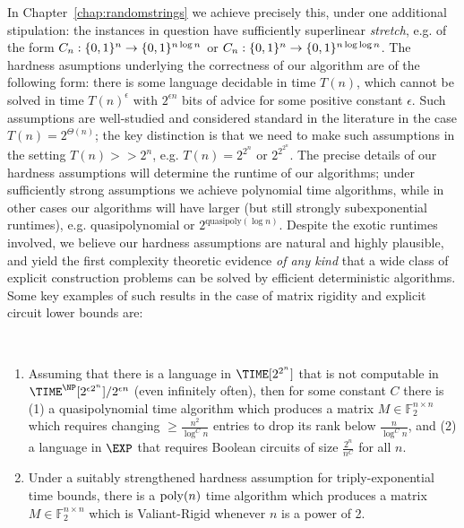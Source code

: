 In Chapter~\ref{chap:randomstrings} we achieve precisely this, under one additional stipulation: the \avoid instances in question have sufficiently superlinear \emph{stretch}, e.g. of the form $C_n: \{0,1\}^n \to \{0,1\}^{n \log n}$ or $C_n: \{0,1\}^n \to \{0,1\}^{n \log \log n}$. The hardness asumptions underlying the correctness of our algorithm are of the following form: there is some language decidable in time $T(n)$, which cannot be solved in time $T(n)^{\epsilon}$ with $2^{\epsilon n}$ bits of advice for some positive constant $\epsilon$. Such assumptions are well-studied and considered standard in the literature in the case $T(n) = 2^{\Theta(n)}$; the key distinction is that we need to make such assumptions in the setting $T(n) >> 2^n$, e.g. $T(n) = 2^{2^n}$ or $2^{2^{2^n}}$. The precise details of our hardness assumptions will determine the runtime of our algorithms; under sufficiently strong assumptions we achieve polynomial time algorithms, while in other cases our algorithms will have larger (but still strongly subexponential runtimes), e.g. quasipolynomial or $2^{\mathrm{quasipoly}(\log n)}$. Despite the exotic runtimes involved, we believe our hardness assumptions are natural and highly plausible, and yield the first complexity theoretic evidence \emph{of any kind} that a wide class of explicit construction problems can be solved by efficient deterministic algorithms. Some key examples of such results in the case of matrix rigidity and explicit circuit lower bounds are:

\begin{theorem*}
~
\begin{enumerate}
    \item Assuming that there is a language in $\TIME[2^{2^n}]$ that is not computable in $\TIME^\NP[2^{\epsilon 2^n}]/2^{\epsilon n}$ (even infinitely often), then for some constant $C$ there is (1) a quasipolynomial time algorithm which produces a matrix $M \in \mathbb{F}_2^{n \times n}$ which requires changing $\geq \frac{n^2}{\log^C n}$ entries to drop its rank below $\frac{n}{\log^C n}$, and (2) a language in $\EXP$ that requires Boolean circuits of size $\frac{2^n}{n^C}$ for all $n$.
    \item Under a suitably strengthened hardness assumption for triply-exponential time bounds, there is a $\mathrm{poly}(n)$ time algorithm which produces a matrix $M \in \mathbb{F}_2^{n \times n}$ which is Valiant-Rigid whenever $n$ is a power of 2.
\end{enumerate}
\end{theorem*}

